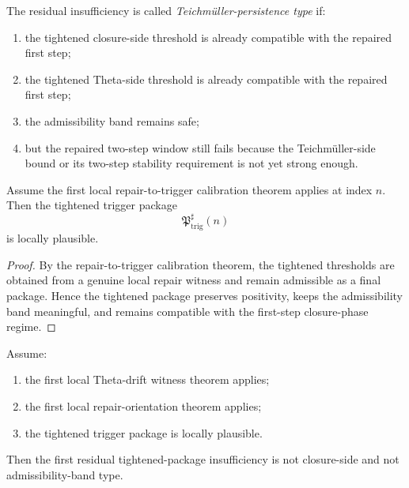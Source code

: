 \begin{definition}
\label{def:teichmueller-persistence-residual-insufficiency}
The residual insufficiency is called \emph{Teichm\"uller-persistence type} if:
\begin{enumerate}
 \item the tightened closure-side threshold is already compatible with the repaired first step;
 \item the tightened Theta-side threshold is already compatible with the repaired first step;
 \item the admissibility band remains safe;
 \item but the repaired two-step window still fails because the Teichm\"uller-side bound or its two-step stability requirement is not yet strong enough.
\end{enumerate}
\end{definition}

\begin{proposition}
\label{prop:the-tightened-package-is-locally-plausible}
Assume the first local repair-to-trigger calibration theorem applies at index $n$.
Then the tightened trigger package
\[
\mathfrak{P}_{\mathrm{trig}}^{\sharp}(n)
\]
is locally plausible.
\end{proposition}

\begin{proof}
By the repair-to-trigger calibration theorem, the tightened thresholds are obtained from a genuine local repair witness and remain admissible as a final package.
Hence the tightened package preserves positivity, keeps the admissibility band meaningful, and remains compatible with the first-step closure-phase regime.
\end{proof}

\begin{proposition}
\label{prop:closure-and-admissibility-are-not-the-first-remaining-insufficiency}
Assume:
\begin{enumerate}
 \item the first local Theta-drift witness theorem applies;
 \item the first local repair-orientation theorem applies;
 \item the tightened trigger package is locally plausible.
\end{enumerate}
Then the first residual tightened-package insufficiency is not closure-side and not admissibility-band type.
\end{proposition}

